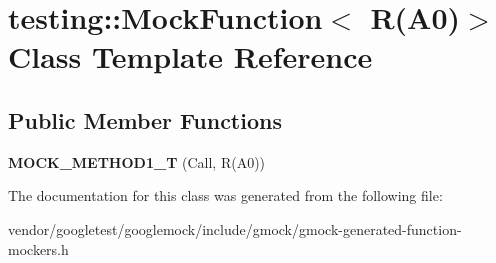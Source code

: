 \hypertarget{classtesting_1_1MockFunction_3_01R_07A0_08_4}{}\section{testing\+:\+:Mock\+Function$<$ R(A0)$>$ Class Template Reference}
\label{classtesting_1_1MockFunction_3_01R_07A0_08_4}
\subsection*{Public Member Functions}
\begin{DoxyCompactItemize}
\item 
{\bfseries M\+O\+C\+K\+\_\+\+M\+E\+T\+H\+O\+D1\+\_\+T} (Call, R(A0))\hypertarget{classtesting_1_1MockFunction_3_01R_07A0_08_4_a6a22e7e14b53d2df30bef4404b41fade}{}\label{classtesting_1_1MockFunction_3_01R_07A0_08_4_a6a22e7e14b53d2df30bef4404b41fade}

\end{DoxyCompactItemize}


The documentation for this class was generated from the following file\+:\begin{DoxyCompactItemize}
\item 
vendor/googletest/googlemock/include/gmock/gmock-\/generated-\/function-\/mockers.\+h\end{DoxyCompactItemize}

